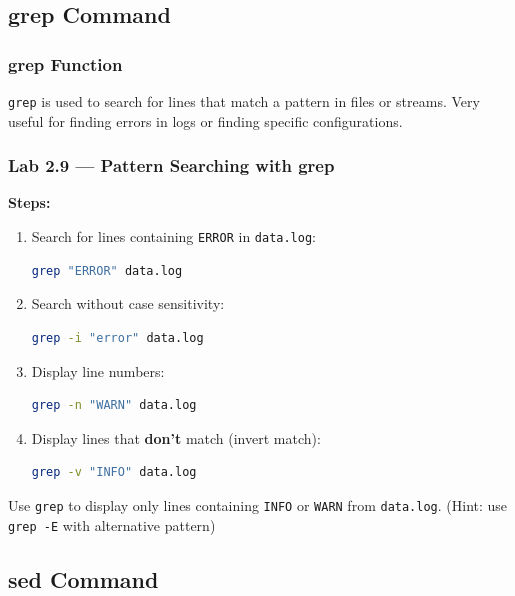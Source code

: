 \subsection{grep Command}
\subsubsection*{grep Function}
\texttt{grep} is used to search for lines that match a pattern in files or streams.
Very useful for finding errors in logs or finding specific configurations.

\subsubsection*{Lab 2.9 --- Pattern Searching with grep}
\textbf{Steps:}
\begin{enumerate}
    \item Search for lines containing \texttt{ERROR} in \texttt{data.log}:
\begin{lstlisting}[language=bash, caption={Simple grep}]
grep "ERROR" data.log
\end{lstlisting}

    \item Search without case sensitivity:
\begin{lstlisting}[language=bash, caption={Case-insensitive grep}]
grep -i "error" data.log
\end{lstlisting}

    \item Display line numbers:
\begin{lstlisting}[language=bash, caption={grep with line numbers}]
grep -n "WARN" data.log
\end{lstlisting}

    \item Display lines that \textbf{don't} match (invert match):
\begin{lstlisting}[language=bash, caption={grep invert match}]
grep -v "INFO" data.log
\end{lstlisting}
\end{enumerate}

\begin{exercisebox}[2.4]
Use \texttt{grep} to display only lines containing \texttt{INFO} or \texttt{WARN} from \texttt{data.log}.
(Hint: use \texttt{grep -E} with alternative pattern)
\end{exercisebox}

\subsection{sed Command}
